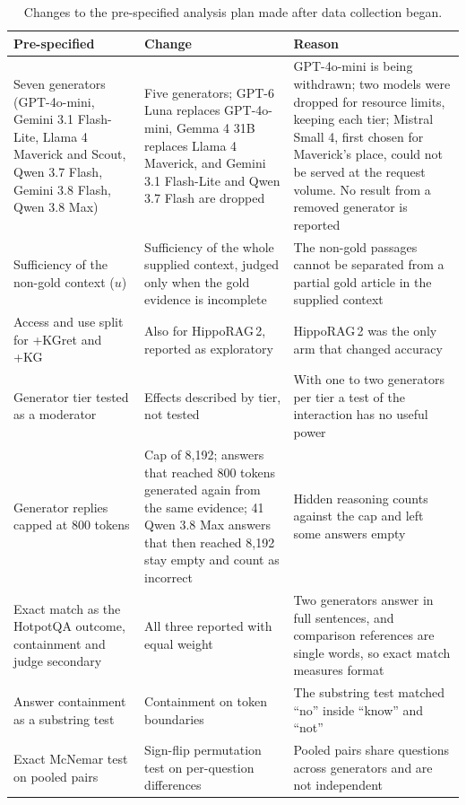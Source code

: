 \documentclass[preprint,12pt]{elsarticle}
\begin{document}
\begin{table}[!tbp]
\centering
\caption{Changes to the pre-specified analysis plan made after data collection
began.}
\label{tab:deviations}
\scriptsize
\begin{tabular}{@{}>{\raggedright\arraybackslash}p{}>{\raggedright\arraybackslash}p{}>{\raggedright\arraybackslash}p{}@{}}
\toprule
Pre-specified & Change & Reason \\
\midrule
Seven generators (GPT-4o-mini, Gemini 3.1 Flash-Lite, Llama 4 Maverick and Scout, Qwen 3.7 Flash, Gemini 3.8 Flash, Qwen 3.8 Max) & Five generators; GPT-6 Luna replaces GPT-4o-mini, Gemma 4 31B replaces Llama 4 Maverick, and Gemini 3.1 Flash-Lite and Qwen 3.7 Flash are dropped & GPT-4o-mini is being withdrawn; two models were dropped for resource limits, keeping each tier; Mistral Small 4, first chosen for Maverick's place, could not be served at the request volume. No result from a removed generator is reported \\
Sufficiency of the non-gold context ($u$) & Sufficiency of the whole supplied context, judged only when the gold evidence is incomplete & The non-gold passages cannot be separated from a partial gold article in the supplied context \\
Access and use split for +KGret and +KG & Also for HippoRAG\,2, reported as exploratory & HippoRAG\,2 was the only arm that changed accuracy \\
Generator tier tested as a moderator & Effects described by tier, not tested & With one to two generators per tier a test of the interaction has no useful power \\
Generator replies capped at 800 tokens & Cap of 8{,}192; answers that reached 800 tokens generated again from the same evidence; 41 Qwen 3.8 Max answers that then reached 8{,}192 stay empty and count as incorrect & Hidden reasoning counts against the cap and left some answers empty \\
Exact match as the HotpotQA outcome, containment and judge secondary & All three reported with equal weight & Two generators answer in full sentences, and comparison references are single words, so exact match measures format \\
Answer containment as a substring test & Containment on token boundaries & The substring test matched ``no'' inside ``know'' and ``not'' \\
Exact McNemar test on pooled pairs & Sign-flip permutation test on per-question differences & Pooled pairs share questions across generators and are not independent \\

\end{tabular}
\end{table}
\end{document}
